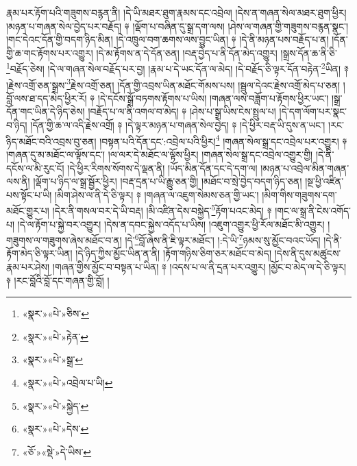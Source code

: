 རྣམ་པར་རྟོག་པའི་གཟུགས་བརྙན་ནི། །དེ་ཡི་མཐར་ཐུག་རྣམས་དང་འབྲེལ། །དེས་ན་གཞན་སེལ་མཐར་ཐུག་ཕྱིར། །མཉན་པ་གཞན་སེལ་བྱེད་པར་བརྗོད། ༈ །ལྡོག་པ་བཞིན་དུ་སྒྲ་དག་ལས། །ཤེས་ལ་གཞན་གྱི་གཟུགས་བརྙན་སྣང་། །གང་དེའང་དོན་གྱི་བདག་ཉིད་མིན། །དེ་འཁྲུལ་བག་ཆགས་ལས་བྱུང་ཡིན། ༈ །དེ་ནི་མཉན་པས་བརྗོད་པ་ན། །དོན་གྱི་ཆ་གང་རྟོགས་པར་འགྱུར། །དེ་མ་རྟོགས་ན་དེ་དོན་ཅན། །བརྡ་བྱེད་པ་ནི་དོན་མེད་འགྱུར། །སྒྲས་དོན་ཆ་ནི་ཅི་\footnote{«སྣར་»«པེ་»ཅིས་}བརྗོད་ཅེས། །དེ་ལ་གཞན་སེལ་བརྗོད་པར་བྱ། །རྣམ་པ་དེ་ཡང་དོན་ལ་མེད། །དེ་བརྗོད་ཅི་ལྟར་དོན་བརྟེན་\footnote{«སྣར་»«པེ་»རྟེན་}ཡིན། ༈ །རྗེས་འགྲོ་ཅན་སྒྲས་\footnote{«སྣར་»«པེ་»སྒྲ་}རྗེས་འགྲོ་ཅན། །དོན་གྱི་འབྲས་ཡིན་མཐོང་གོམས་པས། །སྦྲུལ་དེའང་རྗེས་འགྲོ་མེད་པ་ཅན། །བློ་ལས་ཐ་དད་མེད་ཕྱིར་རོ། ༈ །དེ་དངོས་སྒྲོ་བཏགས་རྟོགས་པ་ཡིས། །གཞན་ལས་བཟློག་པ་རྟོགས་ཕྱིར་ཡང་། །སྒྲ་དོན་གང་ཡིན་དེ་ཉིད་ཅེས། །བརྗོད་པ་ལ་ནི་འགལ་བ་མེད། ༈ །ཤེས་པ་སྒྲ་ཡིས་ངེས་སྤྲུལ་པ། །དེ་དག་ལོག་པར་སྣང་བ་ཉིད། །དོན་གྱི་ཆ་ལ་འདི་རྗེས་འགྲོ། ༈ །དེ་ལྟར་མཉན་པ་གཞན་སེལ་བྱེད། ༈ །དེ་ཕྱིར་བརྡ་ཡི་དུས་ན་ཡང་། །རང་ཉིད་མཐོང་བའི་འབྲས་བུ་ཅན། །བསྟན་པའི་དོན་དང་:འབྲེལ་པའི་ཕྱིར།\footnote{«སྣར་»«པེ་»འབྲེལ་པ་ཡི།} །གཞན་སེལ་སྒྲ་དང་འབྲེལ་པར་འགྱུར། ༈ །གཞན་དུ་མ་མཐོང་ལ་ལྟོས་དང་། །ལ་ལར་དེ་མཐོང་ལ་ལྟོས་ཕྱིར། །གཞན་སེལ་སྒྲ་དང་འབྲེལ་འགྱུར་གྱི། །དེ་ནི་དངོས་ལ་མི་རུང་ངོ། །དེ་ཕྱིར་རིགས་སོགས་དེ་ལྡན་ནི། །ཡོད་མིན་དོན་དང་དེ་དག་ལ། །མཉན་པ་འབྲེལ་མིན་གཞན་ལས་ནི། །ལྡོག་པ་ཉིད་ལ་སྒྲ་སྦྱོར་ཕྱིར། །བརྡ་དྲན་པ་ཡི་རྒྱུ་ཅན་གྱི། །མཐོང་བ་སྲེ་བྱེད་བདག་ཉིད་ཅན། །སྔ་ཕྱི་འཛིན་པས་སྟོང་པ་ཡི། །མིག་ཤེས་ལ་ནི་དེ་ཅི་ལྟར། ༈ །གཞན་ལ་འཇུག་སེམས་ཅན་གྱི་ཡང་། །མིག་གིས་གཟུགས་དག་མཐོང་གྱུར་པ། །དེར་ནི་གསལ་བར་དེ་ཡི་བརྡ། །མི་འཛིན་དེས་བསྐྱེད་\footnote{«སྣར་»«པེ་»སྐྱེད་}རྟོག་པའང་མེད། ༈ །གང་ལ་སྒྲ་ནི་ངེས་འགོད་པ། །དེ་ལ་རྟོག་པ་སྐྱེ་བར་འགྱུར། །དེས་ན་དབང་སྐྱེས་འདོད་པ་ཡིས། །འཇུག་འགྱུར་ཕྱི་རོལ་མཐོང་མི་འགྱུར། །གཟུགས་ལ་གཟུགས་ཞེས་མཐོང་བ་ན། །དེ་\footnote{«སྣར་»«པེ་»དེས་}བློ་ཞེས་ནི་ཇི་ལྟར་མཐོང་། །:དེ་ཡི་\footnote{«ཅོ་»«སྡེ་»དེ་ཡིས་}ཉམས་སུ་མྱོང་བའང་ཡོད། །དེ་ནི་རྟོག་མེད་ཅི་ལྟར་ཡིན། །དེ་ཉིད་ཀྱིས་མྱོང་ཡིན་ན་ནི། །རྟོག་གཉིས་ཅིག་ཅར་མཐོང་བ་མེད། །དེས་ནི་དུས་མཚུངས་རྣམ་པར་ཤེས། །གཞན་གྱིས་མྱོང་བ་བསྟན་པ་ཡིན། ༈ །འདས་པ་ལ་ནི་དྲན་པར་འགྱུར། །མྱོང་བ་མེད་ལ་དེ་ཅི་ལྟར། ༈ །རང་བློའི་བློ་དང་གཞན་གྱི་བློ། །
